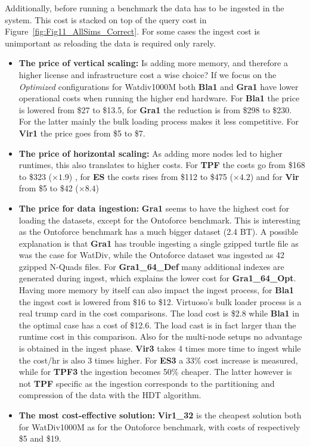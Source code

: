 Additionally, before running a benchmark the data has to be ingested in the system. This cost is stacked on top of the query cost in Figure~\ref{fig:Fig11_AllSims_Correct}. For some cases the ingest cost is unimportant as reloading the data is required only rarely.

\begin{itemize}
	\item \textbf{The price of vertical scaling:} Is adding more memory, and therefore a higher license and infrastructure cost a wise choice? If we focus on the \emph{Optimized} configurations for Watdiv1000M both \textbf{Bla1} and \textbf{Gra1} have lower operational costs when running the higher end hardware. For \textbf{Bla1} the price is lowered from \$27 to \$13.5, for \textbf{Gra1} the reduction is from \$298 to \$230. For the latter mainly the bulk loading process makes it less competitive. For \textbf{Vir1} the price goes from \$5 to \$7.
	
	\item \textbf{The price of horizontal scaling:} As adding more nodes led to higher runtimes, this also translates to higher costs. For \textbf{TPF} the costs go from \$168 to \$323 ($\times 1.9$) , for \textbf{ES} the costs rises from \$112 to \$475 ($\times 4.2$) and for \textbf{Vir} from \$5 to \$42 ($\times 8.4$) 

	\item \textbf{The price for data ingestion:} \textbf{Gra1} seems to have the highest cost for loading the datasets, except for the Ontoforce benchmark. This is interesting as the Ontoforce benchmark has a much bigger dataset (2.4 BT). A possible explanation is that \textbf{Gra1} has trouble ingesting a single gzipped turtle file as was the case for WatDiv, while the Ontoforce dataset was ingested as 42 gzipped N-Quads files.
    For \textbf{Gra1\_64\_Def} many additional indexes are generated during ingest, which explains the lower cost for \textbf{Gra1\_64\_Opt}. Having more memory by itself can also impact the ingest process, for \textbf{Bla1} the ingest cost is lowered from \$16 to \$12. Virtuoso's bulk loader process is a real trump 
    card in the cost comparisons. The load cost is \$2.8 while \textbf{Bla1} in the optimal case has a cost of \$12.6. The load cast is in fact larger than the runtime cost in this comparison.
    Also for the multi-node setups no advantage is obtained in the ingest phase. \textbf{Vir3} takes 4 times more time to ingest while the cost/hr is also 3 times higher. For \textbf{ES3} a 33\% cost increase is measured, while for \textbf{TPF3} the ingestion becomes 50\% cheaper. The latter however is not \textbf{TPF} specific as the ingestion corresponds to the partitioning and compression of the data with the HDT algorithm.

	\item \textbf{The most cost-effective solution:} \textbf{Vir1\_32} is the cheapest solution both for WatDiv1000M as for the Ontoforce benchmark, with costs of respectively \$5 and  \$19. 
\end{itemize}
